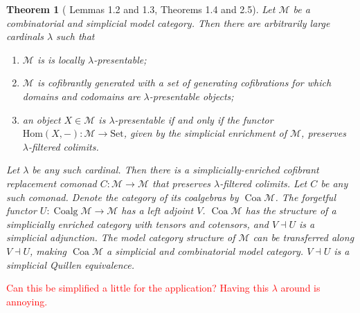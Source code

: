 \documentclass{article}
\newcommand{\todo}[1]{\textcolor{red}{#1}}
\newtheorem{theorem}{Theorem}
\begin{document}
\begin{theorem}[\cite{coalgebraic-models} Lemmas 1.2 and 1.3, Theorems 1.4 and 2.5]
  Let $\mathcal{M}$ be a combinatorial and simplicial model category.
  Then there are arbitrarily large cardinals $\lambda$ such that
  \begin{enumerate}
    \item
      $\mathcal{M}$ is is locally $\lambda$-presentable;
    \item
      $\mathcal{M}$ is cofibrantly generated with a set of generating cofibrations for which domains and codomains are $\lambda$-presentable objects;
    \item
      an object $X \in \mathcal{M}$ is $\lambda$-presentable if and only if the functor $\mathrm{Hom}(X, -) : \mathcal{M} \rightarrow \mathrm{Set}$, given by the simplicial enrichment of $\mathcal{M}$, preserves $\lambda$-filtered colimits.
  \end{enumerate}

  Let $\lambda$ be any such cardinal.
  Then there is a simplicially-enriched cofibrant replacement comonad $C : \mathcal{M} \rightarrow \mathcal{M}$ that preserves $\lambda$-filtered colimits. 
  Let $C$ be any such comonad.
  Denote the category of its coalgebras by $\operatorname{Coa} \mathcal{M}$.
  The forgetful functor $U : \operatorname{Coalg} \mathcal{M} \rightarrow \mathcal{M}$ has a left adjoint $V$.
  $\operatorname{Coa} \mathcal{M}$ has the structure of a simplicially enriched category with tensors and cotensors, and $V \dashv U$ is a simplicial adjunction.
  The model category structure of $\mathcal{M}$ can be transferred along $V \dashv U$, making $\operatorname{Coa} \mathcal{M}$ a simplicial and combinatorial model category.
  $V \dashv U$ is a simplicial Quillen equivalence.
\end{theorem}

\todo{
  Can this be simplified a little for the application?
  Having this $\lambda$ around is annoying.
}



\end{document}
